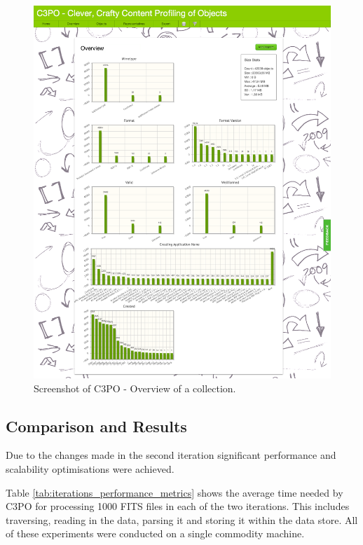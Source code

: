 \begin{figure}[tbp]
\begin{center}
\includegraphics[width=5.5in]{figures/architecture/web_app_overview}
\caption{Screenshot of C3PO - Overview of a collection.}
\label{fig:web_app_overview}
\end{center}
\end{figure}
\clearpage

\subsection{Comparison and Results}
Due to the changes made in the second iteration significant performance and scalability optimisations were achieved.

Table \ref{tab:iterations_performance_metrics} shows the average time needed by C3PO for processing 1000 FITS files in each of the two iterations. This includes traversing, reading in the data, parsing it and storing it within the data store. All of these experiments were conducted on a single commodity machine.

